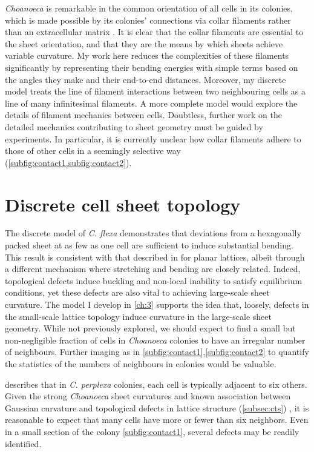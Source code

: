 \textit{Choanoeca} is remarkable in the common orientation of all cells in its colonies, which is made possible by its colonies' connections via collar filaments rather than an extracellular matrix \citep{leadbeater1983}. 
It is clear that the collar filaments are essential to the sheet orientation, and that they are the means by which sheets achieve variable curvature.
My work here reduces the complexities of these filaments significantly by representing their bending energies with simple terms based on the angles they make and their end-to-end distances.
Moreover, my discrete model treats the line of filament interactions between two neighbouring cells as a line of many infinitesimal filaments.
A more complete model would explore the details of filament mechanics between cells.
Doubtless, further work on the detailed mechanics contributing to sheet geometry must be guided by experiments.
In particular, it is currently unclear how collar filaments adhere to those of other cells in a seemingly selective way (\cref{subfig:contact1,subfig:contact2}).

\section{Discrete cell sheet topology}

The discrete model of \textit{C. flexa} demonstrates that deviations from a hexagonally packed sheet at as few as one cell are sufficient to induce substantial bending.
This result is consistent with that described in \citet{seung1988} for planar lattices, albeit through a different mechanism where stretching and bending are closely related.
Indeed, topological defects induce buckling and non-local inability to satisfy equilibrium conditions, yet these defects are also vital to achieving large-scale sheet curvature.
The model I develop in \cref{ch:3} supports the idea that, loosely, defects in the small-scale lattice topology induce curvature in the large-scale sheet geometry.
While not previously explored, we should expect to find a small but non-negligible fraction of cells in \textit{Choanoeca} colonies to have an irregular number of neighbours.
Further imaging as in \cref{subfig:contact1},\ref{subfig:contact2} to quantify the statistics of the numbers of neighbours in colonies would be valuable.

\citet{leadbeater1983} describes that in \textit{C. perplexa} colonies, each cell is typically adjacent to six others. 
Given the strong \textit{Choanoeca} sheet curvatures and known association between Gaussian curvature and topological defects in lattice structure (\cref{subsec:cts}) \citep{sachdev1984,seung1988}, it is reasonable to expect that many cells have more or fewer than six neighbors.
Even in a small section of the colony \cref{subfig:contact1}, several defects may be readily identified.

